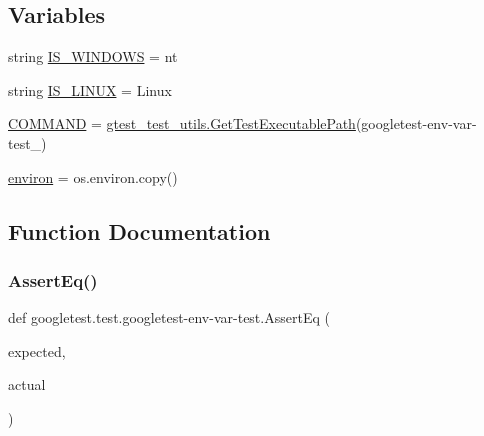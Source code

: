 \subsection*{Variables}
\begin{DoxyCompactItemize}
\item 
string \mbox{\hyperlink{namespacegoogletest_1_1test_1_1googletest-env-var-test_a49ac60f802f403b1610944753da95490}{I\+S\+\_\+\+W\+I\+N\+D\+O\+WS}} = \textquotesingle{}nt\textquotesingle{}
\item 
string \mbox{\hyperlink{namespacegoogletest_1_1test_1_1googletest-env-var-test_a594f790397f9fe6b0bac6c59d7645b10}{I\+S\+\_\+\+L\+I\+N\+UX}} = \textquotesingle{}Linux\textquotesingle{}
\item 
\mbox{\hyperlink{namespacegoogletest_1_1test_1_1googletest-env-var-test_a657d0124a8f8f4483cb4b7b2b33637f0}{C\+O\+M\+M\+A\+ND}} = \mbox{\hyperlink{namespacegoogletest_1_1test_1_1gtest__test__utils_ac9af888c702350aac56b154a6af34098}{gtest\+\_\+test\+\_\+utils.\+Get\+Test\+Executable\+Path}}(\textquotesingle{}googletest-\/env-\/var-\/test\+\_\+\textquotesingle{})
\item 
\mbox{\hyperlink{namespacegoogletest_1_1test_1_1googletest-env-var-test_ae59e036a7b2f2404c117dffd12237ae7}{environ}} = os.\+environ.\+copy()
\end{DoxyCompactItemize}


\subsection{Function Documentation}
\mbox{\label{namespacegoogletest_1_1test_1_1googletest-env-var-test_aff12ee67219f21b80f07df97cc307fc9}} 
\subsubsection{\texorpdfstring{AssertEq()}{AssertEq()}}
{\footnotesize\ttfamily def googletest.\+test.\+googletest-\/env-\/var-\/test.\+Assert\+Eq (\begin{DoxyParamCaption}\item[{}]{expected,  }\item[{}]{actual }\end{DoxyParamCaption})}

